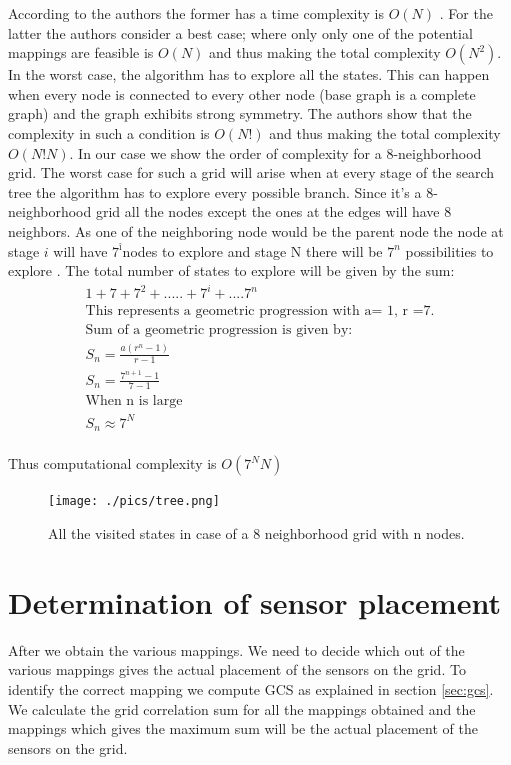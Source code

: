 According to the authors the former has a time complexity is $O(N)$ . For the latter the authors consider a best case; where only only one of the potential mappings are feasible is $O(N)$ and thus making the total complexity $O(N^2)$. In the worst case, the algorithm has to explore all the states. This can happen when every node is connected to every other node (base graph is a complete graph) and the graph exhibits strong symmetry. The authors show that the complexity in such a condition is $O(N!)$ and thus making the total complexity $O(N!N)$.
In our case we show the order of complexity for a 8-neighborhood grid. The worst case for such a grid will arise when at every stage of the search tree the algorithm has to explore every possible branch. Since it's a 8-neighborhood grid all the nodes except the ones at the edges will have 8 neighbors. As one of the neighboring node would be the parent node the node at stage $i$ will have $7^î $nodes to explore and stage N there will be $7^n$ possibilities to explore . The total number of states to explore will be given by the sum:\\

\begin{align*}
1 + 7 + 7^2+ . . . . .+7^i+....7^n\\
\text{This represents a geometric progression with a= 1, r =7.}\\
\text{Sum of a geometric progression is given by:}\\
S_{n}=\frac{a(r^n-1)}{r-1}\\
S_{n}=\frac{7^{n+1} -1}{7-1} \\
\text{When n is large}\\
S_{n} \approx 7^N\\
\end{align*}

Thus computational complexity is $O(7^NN)$

\begin{figure}
\texttt{[image: ./pics/tree.png]}
\caption{All the visited states in case of a 8 neighborhood grid with n nodes.}
\label{fig:ccO}

\end{figure}

\section{Determination of sensor placement}
\label{ref:rotationalSym}
After we obtain the various mappings. We need to decide which out of the various mappings gives the actual placement of the sensors on the grid. To identify the correct mapping we compute GCS as explained in section \ref{sec:gcs}. We calculate the grid correlation sum for all the mappings obtained and the mappings which gives the maximum sum will be the actual placement of the sensors on the grid. 
